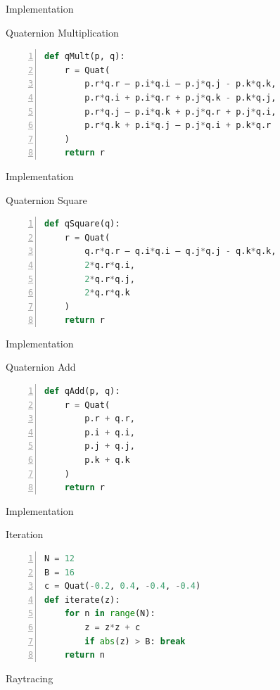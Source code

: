 \documentclass[aspectratio=169,t]{beamer}
\begin{document}
\begin{frame}[label={sec:org1063c3e},fragile]{Implementation}
 \begin{block}{Quaternion Multiplication}
\begin{lstlisting}[language=Python,firstnumber=1,numbers=left]
def qMult(p, q):
    r = Quat(
        p.r*q.r – p.i*q.i – p.j*q.j - p.k*q.k,
        p.r*q.i + p.i*q.r + p.j*q.k - p.k*q.j,
        p.r*q.j – p.i*q.k + p.j*q.r + p.j*q.i,
        p.r*q.k + p.i*q.j – p.j*q.i + p.k*q.r
    )
    return r
\end{lstlisting}
\end{block}
\end{frame}

\begin{frame}[label={sec:orgd0ed24d},fragile]{Implementation}
 \begin{block}{Quaternion Square}
\begin{lstlisting}[language=Python,firstnumber=1,numbers=left]
def qSquare(q):
    r = Quat(
        q.r*q.r – q.i*q.i – q.j*q.j - q.k*q.k,
        2*q.r*q.i,
        2*q.r*q.j,
        2*q.r*q.k
    )
    return r
\end{lstlisting}
\end{block}
\end{frame}

\begin{frame}[label={sec:orgbc0761a},fragile]{Implementation}
 \begin{block}{Quaternion Add}
\begin{lstlisting}[language=Python,firstnumber=1,numbers=left]
def qAdd(p, q):
    r = Quat(
        p.r + q.r,
        p.i + q.i,
        p.j + q.j,
        p.k + q.k
    )
    return r
\end{lstlisting}
\end{block}
\end{frame}

\begin{frame}[label={sec:org2788d48},fragile]{Implementation}
 \begin{block}{Iteration}
\begin{lstlisting}[language=Python,firstnumber=1,numbers=left]
N = 12
B = 16
c = Quat(-0.2, 0.4, -0.4, -0.4)
def iterate(z):
    for n in range(N):
        z = z*z + c
        if abs(z) > B: break
    return n
\end{lstlisting}
\end{block}
\end{frame}

\begin{frame}[label={sec:orgcf048d3}]{Raytracing}
\end{frame}
\end{document}
